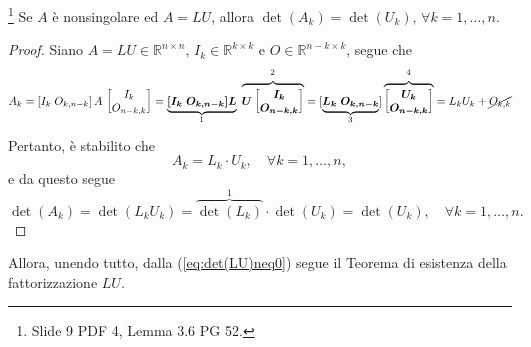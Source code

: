 \begin{lemma}
    \footnote{Slide 9 PDF 4, Lemma 3.6 PG 52.}
    Se $A$ è nonsingolare ed $A=LU$, allora $\det(A_k)=\det(U_k),\, \forall k=1,\hdots, n.$
\end{lemma}
\begin{proof}
    Siano $A=LU\in\mathbb R^{n\times n},\, I_k\in\mathbb R^{k\times k}$ e $O\in\mathbb R^{n-k\times k}$, segue che
    \begin{equation}
        A_k=[I_k\; O_{k,n-k}]\, A\, \begin{bmatrix}
            I_k\\
            O_{n-k,k}
        \end{bmatrix}=
        \underbrace{\boldsymbol{[I_k\; O_{k,n-k}] L}}_{\footnotemark}\;\overbrace{\boldsymbol{U\begin{bmatrix}
            I_k\\
            O_{n-k,k}
        \end{bmatrix}}}^{\footnotemark} = [\underbrace{\boldsymbol{L_k\; O_{k,n-k}}}_{\footnotemark}]\overbrace{\boldsymbol{
        \begin{bmatrix}
            U_k\\
            O_{n-k,k}
        \end{bmatrix}}}^{\footnotemark} = L_kU_k+\cancel{O_{k,k}}
    \end{equation}
    Pertanto, è stabilito che
    \begin{equation*}
        A_k=L_k\cdot U_k,\quad \forall k=1,\hdots, n,
    \end{equation*}
    e da questo segue
    \begin{equation*}
        \det(A_k)=\det(L_k  U_k) = \overbrace{\det(L_k)}^1 \cdot\det(U_k) = \det(U_k),\quad \forall k=1,\hdots, n.
    \end{equation*}
\end{proof}

\addtocounter{footnote}{-3}




Allora, unendo tutto, dalla (\ref{eq:det(LU)neq0}) segue il Teorema di esistenza della fattorizzazione $LU$.

